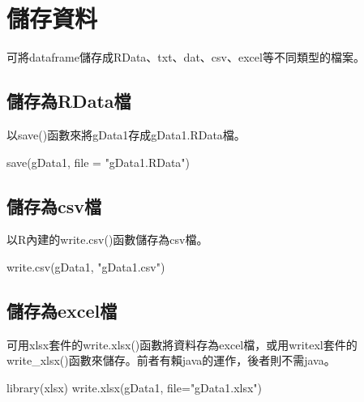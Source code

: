\documentclass[
]{book}
\newenvironment{Shaded}{\begin{snugshade}}{\end{snugshade}}
\newcommand{\AttributeTok}[1]{\textcolor[rgb]{0.77,0.63,0.00}{#1}}
\newcommand{\FunctionTok}[1]{\textcolor[rgb]{0.00,0.00,0.00}{#1}}
\newcommand{\NormalTok}[1]{#1}
\newcommand{\StringTok}[1]{\textcolor[rgb]{0.31,0.60,0.02}{#1}}
\begin{document}
\hypertarget{ux5132ux5b58ux8cc7ux6599}{%
\section{儲存資料}\label{ux5132ux5b58ux8cc7ux6599}}

可將dataframe儲存成RData、txt、dat、csv、excel等不同類型的檔案。

\hypertarget{ux5132ux5b58ux70bardataux6a94}{%
\subsection{儲存為RData檔}\label{ux5132ux5b58ux70bardataux6a94}}

以save()函數來將gData1存成gData1.RData檔。

\begin{Shaded}
\begin{Highlighting}[]
\FunctionTok{save}\NormalTok{(gData1, }\AttributeTok{file =} \StringTok{"gData1.RData"}\NormalTok{)}
\end{Highlighting}
\end{Shaded}

\hypertarget{ux5132ux5b58ux70bacsvux6a94}{%
\subsection{儲存為csv檔}\label{ux5132ux5b58ux70bacsvux6a94}}

以R內建的write.csv()函數儲存為csv檔。

\begin{Shaded}
\begin{Highlighting}[]
\FunctionTok{write.csv}\NormalTok{(gData1, }\StringTok{"gData1.csv"}\NormalTok{)}
\end{Highlighting}
\end{Shaded}

\hypertarget{ux5132ux5b58ux70baexcelux6a94}{%
\subsection{儲存為excel檔}\label{ux5132ux5b58ux70baexcelux6a94}}

可用xlsx套件的write.xlsx()函數將資料存為excel檔，或用writexl套件的write\_xlsx()函數來儲存。前者有賴java的運作，後者則不需java。

\begin{Shaded}
\begin{Highlighting}[]
\FunctionTok{library}\NormalTok{(xlsx)}
\FunctionTok{write.xlsx}\NormalTok{(gData1, }\AttributeTok{file=}\StringTok{"gData1.xlsx"}\NormalTok{)}
\end{Highlighting}
\end{Shaded}
\end{document}
